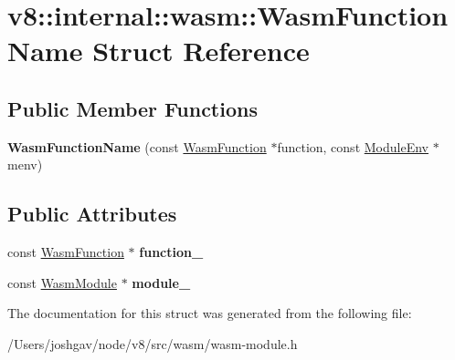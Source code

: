 \hypertarget{structv8_1_1internal_1_1wasm_1_1_wasm_function_name}{}\section{v8\+:\+:internal\+:\+:wasm\+:\+:Wasm\+Function\+Name Struct Reference}
\label{structv8_1_1internal_1_1wasm_1_1_wasm_function_name}
\subsection*{Public Member Functions}
\begin{DoxyCompactItemize}
\item 
{\bfseries Wasm\+Function\+Name} (const \hyperlink{structv8_1_1internal_1_1wasm_1_1_wasm_function}{Wasm\+Function} $\ast$function, const \hyperlink{structv8_1_1internal_1_1wasm_1_1_module_env}{Module\+Env} $\ast$menv)\hypertarget{structv8_1_1internal_1_1wasm_1_1_wasm_function_name_a8b0fa88586d0a4a550defa4221bb4204}{}\label{structv8_1_1internal_1_1wasm_1_1_wasm_function_name_a8b0fa88586d0a4a550defa4221bb4204}

\end{DoxyCompactItemize}
\subsection*{Public Attributes}
\begin{DoxyCompactItemize}
\item 
const \hyperlink{structv8_1_1internal_1_1wasm_1_1_wasm_function}{Wasm\+Function} $\ast$ {\bfseries function\+\_\+}\hypertarget{structv8_1_1internal_1_1wasm_1_1_wasm_function_name_ae2424a423048d726270faf5f42b5f142}{}\label{structv8_1_1internal_1_1wasm_1_1_wasm_function_name_ae2424a423048d726270faf5f42b5f142}

\item 
const \hyperlink{structv8_1_1internal_1_1wasm_1_1_wasm_module}{Wasm\+Module} $\ast$ {\bfseries module\+\_\+}\hypertarget{structv8_1_1internal_1_1wasm_1_1_wasm_function_name_abc17a8ac528fd5c78310ebbd5569d587}{}\label{structv8_1_1internal_1_1wasm_1_1_wasm_function_name_abc17a8ac528fd5c78310ebbd5569d587}

\end{DoxyCompactItemize}


The documentation for this struct was generated from the following file\+:\begin{DoxyCompactItemize}
\item 
/\+Users/joshgav/node/v8/src/wasm/wasm-\/module.\+h\end{DoxyCompactItemize}
